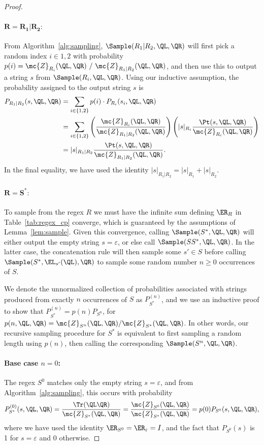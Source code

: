 \begin{proof}
\paragraph{$\mathbf{R = R_1 | R_2:}$} From Algorithm~\ref{alg:sampling},
$\Sample(R_1 | R_2, \QL, \QR)$ will first pick a random index $i \in {1, 2}$ with probability $p(i) = \mc{Z}_{R_i}(\QL, \QR) \ / \ \mc{Z}_{R_1 | R_2}(\QL, \QR)$, and then use this to output a string $s$ from $\Sample(R_i, \QL, \QR)$. Using our inductive assumption, the probability assigned to the output string $s$ is
%
\begin{align*}
    P_{R_1 | R_2}(s, \QL, \QR) &= \sum_{i \in \{1, 2\}} p(i) \cdot P_{R_i}(s_i, \QL, \QR) \\
    &= \sum_{i \in \{1, 2\}} \left( \frac{\mc{Z}_{R_i}(\QL, \QR)}{\mc{Z}_{R_1 | R_2}(\QL, \QR)} \right) \left( |s|_{R_i} \frac{\Pt(s, \QL, \QR)}{\mc{Z}_{R_i}(\QL, \QR)} \right) \\
    &= |s|_{R_1 | R_2} \frac{\Pt(s, \QL, \QR)}{\mc{Z}_{R_1 | R_2}(\QL, \QR)}.
\end{align*}
%
In the final equality, we have used the identity $|s|_{R_1 | R_2} = |s|_{R_1} + |s|_{R_2}$.

\paragraph{$\mathbf{R = S^*:}$} To sample from the regex $R$ we must have the infinite sum defining $\ER_R$ in Table~\ref{tab:regex_cp} 
converge, which is guaranteed by the assumptions of Lemma~\ref{lem:sample}. Given this convergence, calling $\Sample(S^*, \QL, \QR)$ will either output the empty string $s = \varepsilon$, or else call $\Sample(SS^*, \QL, \QR)$. In the latter case, the concatenation rule will then sample some $s' \in S$ before calling $\Sample(S^*, \EL_{s'}(\QL), \QR)$ to sample some random number $n \geq 0$ occurrences of $S$.

We denote the unnormalized collection of probabilities associated with strings produced from exactly $n$ occurrences of $S$ as $P_{S^*}^{(n)}$, and we use an inductive proof to show that $P_{S^*}^{(n)} = p(n) P_{S^n}$, for $p(n, \QL, \QR) = \mc{Z}_{S^n}(\QL, \QR) / \mc{Z}_{S^*}(\QL, \QR)$. In other words, our recursive sampling procedure for $S^*$ is equivalent to first sampling a random length using $p(n)$, then calling the corresponding $\Sample(S^n, \QL, \QR)$.

\paragraph{\textbf{Base case} $n = 0$: } The regex $S^0$ matches only the empty string $s = \varepsilon$, and from Algorithm~\ref{alg:sampling},
this occurs with probability
%
\begin{equation*}
    P_{S^*}^{(0)}(s, \QL, \QR) = \frac{\Tr(\QL \QR)}{\mc{Z}_{S^*}(\QL, \QR)} = \frac{\mc{Z}_{S^0}(\QL, \QR)}{\mc{Z}_{S^*}(\QL, \QR)} = p(0) P_{S^0}(s, \QL, \QR),
\end{equation*}
%
where we have used the identity $\ER_{S^0} = \ER_\varepsilon = I$, and the fact that $P_{S^0}(s)$ is 1 for $s = \varepsilon$ and 0 otherwise. 


\end{proof}
